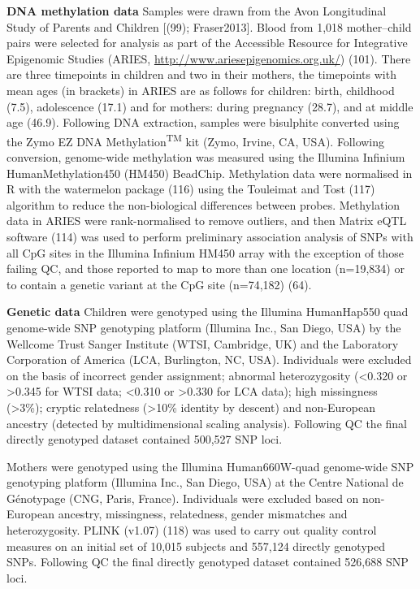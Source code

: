 \documentclass[11pt,twoside]{bristolthesis}
\begin{document}
\textbf{DNA methylation data}
Samples were drawn from the Avon Longitudinal Study of Parents and Children {[}(99); Fraser2013{]}. Blood from 1,018 mother--child pairs were selected for analysis as part of the Accessible Resource for Integrative Epigenomic Studies (ARIES, \url{http://www.ariesepigenomics.org.uk/}) (101). There are three timepoints in children and two in their mothers, the timepoints with mean ages (in brackets) in ARIES are as follows for children: birth, childhood (7.5), adolescence (17.1) and for mothers: during pregnancy (28.7), and at middle age (46.9). Following DNA extraction, samples were bisulphite converted using the Zymo EZ DNA Methylation\textsuperscript{TM} kit (Zymo, Irvine, CA, USA). Following conversion, genome-wide methylation was measured using the Illumina Infinium HumanMethylation450 (HM450) BeadChip. Methylation data were normalised in R with the watermelon package (116) using the Touleimat and Tost (117) algorithm to reduce the non-biological differences between probes. Methylation data in ARIES were rank-normalised to remove outliers, and then Matrix eQTL software (114) was used to perform preliminary association analysis of SNPs with all CpG sites in the Illumina Infinium HM450 array with the exception of those failing QC, and those reported to map to more than one location (n=19,834) or to contain a genetic variant at the CpG site (n=74,182) (64).

\textbf{Genetic data}
Children were genotyped using the Illumina HumanHap550 quad genome-wide SNP genotyping platform (Illumina Inc., San Diego, USA) by the Wellcome Trust Sanger Institute (WTSI, Cambridge, UK) and the Laboratory Corporation of America (LCA, Burlington, NC, USA). Individuals were excluded on the basis of incorrect gender assignment; abnormal heterozygosity (\textless0.320 or \textgreater0.345 for WTSI data; \textless0.310 or \textgreater0.330 for LCA data); high missingness (\textgreater3\%); cryptic relatedness (\textgreater10\% identity by descent) and non-European ancestry (detected by multidimensional scaling analysis). Following QC the final directly genotyped dataset contained 500,527 SNP loci.

Mothers were genotyped using the Illumina Human660W-quad genome-wide SNP genotyping platform (Illumina Inc., San Diego, USA) at the Centre National de Génotypage (CNG, Paris, France). Individuals were excluded based on non-European ancestry, missingness, relatedness, gender mismatches and heterozygosity. PLINK (v1.07) (118) was used to carry out quality control measures on an initial set of 10,015 subjects and 557,124 directly genotyped SNPs. Following QC the final directly genotyped dataset contained 526,688 SNP loci.
\end{document}
